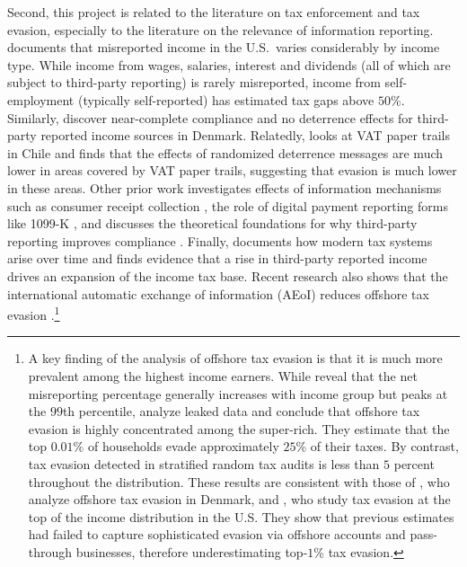 \documentclass[12pt]{article}
\begin{document}
Second, this project is related to the literature on tax enforcement and tax evasion, especially to the literature on the relevance of information reporting. \textcite{slemrod2007cheating} documents that misreported income in the U.S.\ varies considerably by income type. While income from wages, salaries, interest and dividends (all of which are subject to third-party reporting) is rarely misreported, income from self-employment (typically self-reported) has estimated tax gaps above $50$\%. Similarly, \textcite{kleven2011unwilling} discover near-complete compliance and no deterrence effects for third-party reported income sources in Denmark. Relatedly, \textcite{pomeranz2015no} looks at VAT paper trails in Chile and finds that the effects of randomized deterrence messages are much lower in areas covered by VAT paper trails, suggesting that evasion is much lower in these areas. Other prior work investigates effects of information mechanisms such as consumer receipt collection \parencite{naritomi2019consumers}, the role of digital payment reporting forms like 1099-K \parencite{slemrod2017does}, and discusses the theoretical foundations for why third-party reporting improves compliance \parencite{kleven2016can}. Finally, \textcite{jensen2022employment} documents how modern tax systems arise over time and finds evidence that a rise in third-party reported income drives an expansion of the income tax base. Recent research also shows that the international automatic exchange of information (AEoI) reduces offshore tax evasion \parencite{boas2024taxing,baselgia2023compliance}.\footnote{A key finding of the analysis of offshore tax evasion is that it is much more prevalent among the highest income earners. While \textcite{johns2010distribution} reveal that the net misreporting percentage generally increases with income group but peaks at the $99$th percentile, \textcite{alstadsaeter2019tax} analyze leaked data and conclude that offshore tax evasion is highly concentrated among the super-rich. They estimate that the top $0.01$\% of households evade approximately $25$\% of their taxes. By contrast, tax evasion detected in stratified random tax audits is less than $5$ percent throughout the distribution. These results are consistent with those of \textcite{boas2024taxing}, who analyze offshore tax evasion in Denmark, and \textcite{guyton2021tax}, who study tax evasion at the top of the income distribution in the U.S. They show that previous estimates had failed to capture sophisticated evasion via offshore accounts and pass-through businesses, therefore underestimating top-$1$\% tax evasion.}
\end{document}
